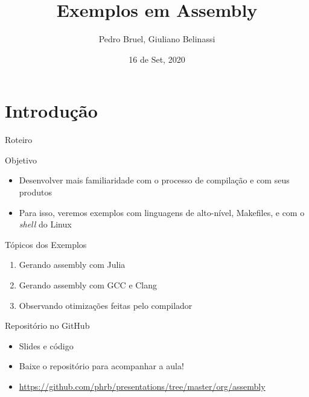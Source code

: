 \documentclass[10pt, compress, aspectratio=169, xcolor={table,usenames,dvipsnames}]{beamer}
\author{ \footnotesize Pedro Bruel, Giuliano Belinassi}
\date{ \scriptsize 16 de Set, 2020}
\title{Exemplos em Assembly}
\begin{document}
\maketitle

\section{Introdução}
\label{sec:org055d33d}
\begin{frame}[label={sec:orgef38c21}]{Roteiro}
\begin{block}{Objetivo}
\begin{itemize}
\item Desenvolver mais familiaridade com o processo de compilação e com seus produtos
\item Para isso, veremos  exemplos com linguagens de alto-nível,  Makefiles, e com o
\emph{shell} do Linux
\end{itemize}
\end{block}
\begin{block}{Tópicos dos Exemplos}
\begin{enumerate}
\item Gerando assembly com Julia
\item Gerando assembly com GCC e Clang
\item Observando otimizações feitas pelo compilador
\end{enumerate}
\end{block}
\begin{block}{Repositório no GitHub}
\begin{itemize}
\item Slides e código
\item Baixe o repositório para acompanhar a aula!
\item \url{https://github.com/phrb/presentations/tree/master/org/assembly}
\end{itemize}
\end{block}
\end{frame}
\end{document}
